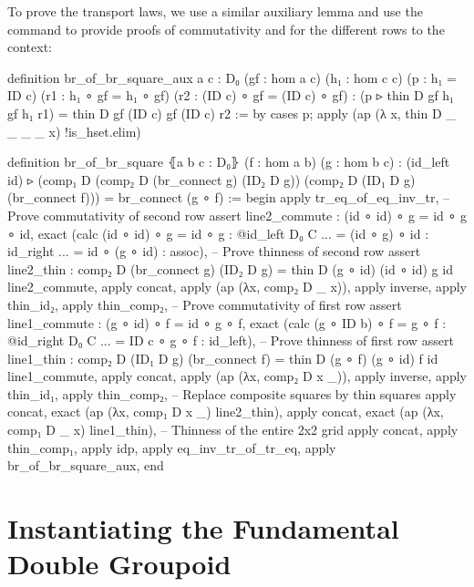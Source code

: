 To prove the transport laws, we use a similar auxiliary lemma and use the
 command to provide proofs of commutativity and  for the different
rows to the context:
\begin{leancodebr}
  definition br_of_br_square_aux {a c : D₀} (gf : hom a c)
    (h₁ : hom c c) (p : h₁ = ID c)
    (r1 : h₁ ∘ gf = h₁ ∘ gf) (r2 : (ID c) ∘ gf = (ID c) ∘ gf) :
    (p ▹ thin D gf h₁ gf h₁ r1) = thin D gf (ID c) gf (ID c) r2 :=
  by cases p; apply (ap (λ x, thin D _ _ _ _ x) !is_hset.elim)

  definition br_of_br_square ⦃a b c : D₀⦄ (f : hom a b) (g : hom b c) :
    (id_left id) ▹ (comp₁ D (comp₂ D (br_connect g) (ID₂ D g))
      (comp₂ D (ID₁ D g) (br_connect f)))
    = br_connect (g ∘ f) :=
  begin
    apply tr_eq_of_eq_inv_tr,
    -- Prove commutativity of second row
    assert line2_commute : (id ∘ id) ∘ g = id ∘ g ∘ id,
      exact (calc (id ∘ id) ∘ g = id ∘ g : @id_left D₀ C
                           ... = (id ∘ g) ∘ id : id_right
                           ... = id ∘ (g ∘ id) : assoc),
    -- Prove thinness of second row
    assert line2_thin : comp₂ D (br_connect g) (ID₂ D g)
      = thin D (g ∘ id) (id ∘ id) g id line2_commute,
      apply concat, apply (ap (λx, comp₂ D _ x)), apply inverse, apply thin_id₂,
      apply thin_comp₂,
    -- Prove commutativity of first row
    assert line1_commute : (g ∘ id) ∘ f = id ∘ g ∘ f,
      exact (calc (g ∘ ID b) ∘ f = g ∘ f : @id_right D₀ C
                            ... = ID c ∘ g ∘ f : id_left),
    -- Prove thinness of first row
    assert line1_thin : comp₂ D (ID₁ D g) (br_connect f)
      = thin D (g ∘ f) (g ∘ id) f id line1_commute,
      apply concat, apply (ap (λx, comp₂ D x _)), apply inverse, apply thin_id₁,
      apply thin_comp₂,
    -- Replace composite squares by thin squares
    apply concat, exact (ap (λx, comp₁ D x _) line2_thin),
    apply concat, exact (ap (λx, comp₁ D _ x) line1_thin),
    -- Thinness of the entire 2x2 grid
    apply concat, apply thin_comp₁, apply idp,
    apply eq_inv_tr_of_tr_eq,
    apply br_of_br_square_aux,
  end
\end{leancodebr}

\section{Instantiating the Fundamental Double Groupoid}





